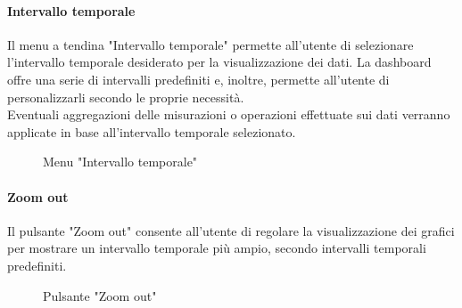 \paragraph{Intervallo temporale}
Il menu a tendina "Intervallo temporale" permette all'utente di selezionare l'intervallo temporale desiderato per la visualizzazione dei dati. La dashboard offre una serie di intervalli predefiniti e, inoltre, permette all'utente di personalizzarli secondo le proprie necessità.\\
Eventuali aggregazioni delle misurazioni o operazioni effettuate sui dati verranno applicate in base all'intervallo temporale selezionato.
\begin{figure}[H]
    \centering
    \caption{Menu "Intervallo temporale"}
    \label{fig:my_label}
\end{figure}

\paragraph{Zoom out}
Il pulsante "Zoom out" consente all'utente di regolare la visualizzazione dei grafici per mostrare un intervallo temporale più ampio, secondo intervalli temporali predefiniti.
\begin{figure}[H]
    \centering
    \caption{Pulsante "Zoom out"}
    \label{fig:my_label}
\end{figure}

